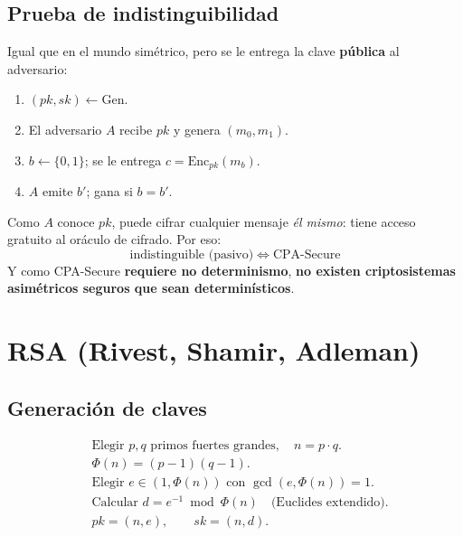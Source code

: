 \documentclass[11pt,a4paper]{article}
\begin{document}
\subsection{Prueba de indistinguibilidad}

Igual que en el mundo simétrico, pero se le entrega la clave \textbf{pública} al
adversario:

\begin{enumerate}[leftmargin=1.6em,nosep]
  \item $(pk, sk) \leftarrow \mathrm{Gen}$.
  \item El adversario $A$ recibe $pk$ y genera $(m_0, m_1)$.
  \item $b \leftarrow \{0,1\}$; se le entrega $c = \mathrm{Enc}_{pk}(m_b)$.
  \item $A$ emite $b'$; gana si $b = b'$.
\end{enumerate}

\begin{destacado}
Como $A$ conoce $pk$, puede cifrar cualquier mensaje \emph{él mismo}: tiene acceso
gratuito al oráculo de cifrado. Por eso:
\[
  \text{indistinguible (pasivo)} \;\Leftrightarrow\; \text{CPA-Secure}
\]
Y como CPA-Secure \textbf{requiere no determinismo}, \textbf{no existen
criptosistemas asimétricos seguros que sean determinísticos}.
\end{destacado}

\section{RSA (Rivest, Shamir, Adleman)}

\subsection{Generación de claves}

\begin{align*}
&\text{Elegir } p, q \text{ primos fuertes grandes}, \quad n = p \cdot q.\\
&\Phi(n) = (p-1)(q-1).\\
&\text{Elegir } e \in (1, \Phi(n)) \text{ con } \gcd(e, \Phi(n)) = 1.\\
&\text{Calcular } d = e^{-1} \bmod \Phi(n)
  \quad\text{(Euclides extendido)}.\\
&pk = (n, e), \qquad sk = (n, d).
\end{align*}
\end{document}
